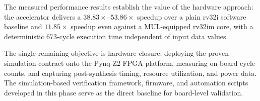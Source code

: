 ﻿\documentclass[12pt,a4paper]{report}
\begin{document}
The measured performance results establish the value of the hardware approach: the accelerator delivers a $38.83\times$--$53.86\times$ speedup over a plain rv32i software baseline and $11.85\times$ speedup even against a MUL-equipped rv32im core, with a deterministic 673-cycle execution time independent of input data values.

The single remaining objective is hardware closure: deploying the proven simulation contract onto the Pynq-Z2 FPGA platform, measuring on-board cycle counts, and capturing post-synthesis timing, resource utilization, and power data.
The simulation-based verification framework, firmware, and automation scripts developed in this phase serve as the direct baseline for board-level validation.



\end{document}
